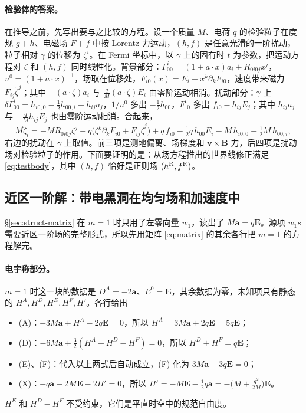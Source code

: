 \documentclass[11pt,a4paper]{ctexart}
\begin{document}
\paragraph{检验体的答案。}在推导之前，先写出要与之比较的方程。设一个质量 $M$、电荷 $q$ 的检验粒子在度规 $g+h$、电磁场 $F+f$ 中按 Lorentz 力运动，$(h,f)$ 是任意光滑的一阶扰动，粒子相对 $\gamma$ 的位移为 $\zeta^i$。在 Fermi 坐标中，以 $\gamma$ 上的固有时 $t$ 为参数，把运动方程对 $\zeta$ 和 $(h,f)$ 同时线性化。背景部分：$\Gamma^i_{00}=(1+a\cdot x)a_i+R_{0i0j}x^j$，$u^0=(1+a\cdot x)^{-1}$，场取在位移处，$F_{i0}(x)=E_i+x^k\partial_kF_{i0}$，速度带来磁力 $F_{ij}\dot\zeta^j$；其中 $-(a\cdot\zeta)a_i$ 与 $\tfrac qM(a\cdot\zeta)E_i$ 由零阶运动相消。扰动部分：$\gamma$ 上 $\delta\Gamma^i_{00}=h_{i0,0}-\tfrac12h_{00,i}-h_{ij}a_j$，$1/u^0$ 多出 $-\tfrac12h_{00}$，$F^i{}_0$ 多出 $f_{i0}-h_{ij}E_j$；其中 $h_{ij}a_j$ 与 $-\tfrac qMh_{ij}E_j$ 也由零阶运动相消。合起来，
\begin{equation}
M\ddot\zeta_i=-M R_{0i0j}\zeta^j+q\big(\zeta^k\partial_kF_{i0}+F_{ij}\dot\zeta^j\big)
+q\,f_{i0}-\tfrac12q\,h_{00}E_i-M\,h_{i0,0}+\tfrac12M\,h_{00,i},
\label{eq:testbody}
\end{equation}
右边的扰动在 $\gamma$ 上取值。前三项是测地偏离、场梯度和 $\boldsymbol v\times\boldsymbol B$ 力，后四项是扰动场对检验粒子的作用。下面要证明的是：从场方程推出的世界线修正满足 \eqref{eq:testbody}，其中 $(h,f)$ 恰好是正则场 $(h^{\rm R},f^{\rm R})$。

\subsection{近区一阶解：带电黑洞在均匀场和加速度中}\label{sec:first-near1}

\S\ref{sec:struct-matrix} 在 $m=1$ 时只用了左零向量 $w_1$，读出了 $M\boldsymbol a=q\boldsymbol E$。源项 $w_1s$ 需要近区一阶场的完整形式，所以先用矩阵 \eqref{eq:matrix} 的其余各行把 $m=1$ 的方程解完。

\paragraph{电宇称部分。}$m=1$ 时这一块的数据是 $D^A=-2\boldsymbol a$、$E^0=\boldsymbol E$，其余数据为零，未知项只有静态的 $H^A,H^D,H^E,H^F,H'$。各行给出
\begin{itemize}[nosep]
\item (A)：$-3M\boldsymbol a+H^A-2q\boldsymbol E=0$，所以 $H^A=3M\boldsymbol a+2q\boldsymbol E=5q\boldsymbol E$；
\item (D)：$-6M\boldsymbol a+\tfrac32(H^A-H^D-H^F)=0$，所以 $H^D+H^F=q\boldsymbol E$；
\item (E)、(F)：代入以上两式后自动成立，(F) 化为 $3M\boldsymbol a-3q\boldsymbol E=0$；
\item (X)：$-q\boldsymbol a-2M\boldsymbol E-2H'=0$，所以 $H'=-M\boldsymbol E-\tfrac12q\boldsymbol a=-\big(M+\tfrac{q^2}{2M}\big)\boldsymbol E$。
\end{itemize}
$H^E$ 和 $H^D-H^F$ 不受约束，它们是平直时空中的规范自由度。
\end{document}
